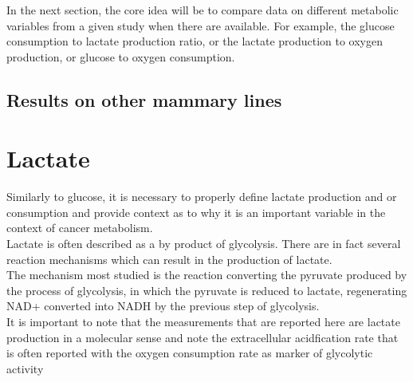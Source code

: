 \documentclass[11pt,a4paper]{article}
\begin{document}
In the next section, the core idea will be to compare data on different metabolic variables from a given study when there are available. For example, the glucose consumption to lactate production ratio, or the lactate production to oxygen production, or glucose to oxygen consumption.  

% 
\subsection{Results on other mammary lines}

\section{Lactate}
Similarly to glucose, it is necessary to properly define lactate production and or consumption and provide context as to why it is an important  variable in the context of cancer metabolism.\\

Lactate is often described as a by product of glycolysis. There are in  fact several reaction mechanisms which can result in the production of lactate. \\

The mechanism most studied is the reaction converting the pyruvate produced  by the process of glycolysis, in which the pyruvate is reduced to lactate, regenerating NAD+ converted into NADH by the previous step of glycolysis.\cite{Berg2006}\\

It is important to note that the measurements that are reported here are lactate production in a molecular sense and note the extracellular acidfication rate that is often reported with the oxygen consumption rate as marker of glycolytic activity 
\end{document}
